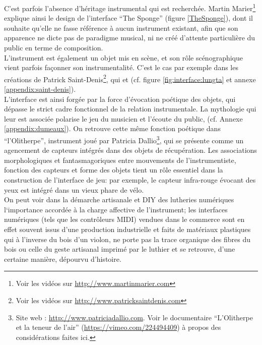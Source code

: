 \noindent C'est parfois l'absence d'héritage instrumental qui est recherchée. Martin Marier\footnote{Voir les vidéos sur \url{http://www.martinmarier.com}} explique ainsi le design de l'interface ``The Sponge'' \cite{marier_sponge_2010} (figure \ref{TheSponge}), dont il souhaite qu'elle ne fasse référence à aucun instrument existant, afin que son apparence ne dicte pas de paradigme musical, ni ne créé d'attente particulière du public en terme de composition.\\
\indent L'instrument est également un objet mis en scène, et son rôle scénographique vient parfois façonner son instrumentalité. C'est le cas par exemple dans les créations de Patrick Saint-Denis\footnote{Voir les vidéos sur \url{http://www.patricksaintdenis.com}}, qui  et  (cf. figure \ref{fig:interface:lungta} et annexe \ref{appendix:saint-denis}).\\
\indent L'interface est ainsi forgée par la force d'évocation poétique des objets, qui dépasse le strict cadre fonctionnel de la relation instrumentale. La mythologie qui leur est associée polarise le jeu du musicien et l'écoute du public,  (cf. Annexe \ref{appendix:dumeaux}). On retrouve cette même fonction poétique dans ``l'Olitherpe'', instrument joué par Patricia Dallio\footnote{Site web : \url{http://www.patriciadallio.com}. Voir le documentaire ``L'Olitherpe et la teneur de l'air'' (\url{https://vimeo.com/224494409}) à propos des considérations faites ici.}, qui se présente comme un agencement de capteurs intégrés dans des objets de récupération. Les associations morphologiques et fantasmagoriques entre mouvements de l'instrumentiste, fonction des capteurs et forme des objets tient un rôle essentiel dans la construction de l'interface de jeu: par exemple, le capteur infra-rouge évocant des yeux est intégré dans un vieux phare de vélo.\\
\indent On peut voir dans la démarche artisanale et \gls{DIY} des lutheries numériques l`importance accordée à la charge affective de l'instrument; les interfaces numériques (tels que les contrôleurs \gls{MIDI}) vendues dans le commerce sont en effet souvent issus d'une production industrielle et faits de matériaux plastiques qui à l'inverse du bois d'un violon, ne porte pas la trace organique des fibres du bois ou celle du geste artisanal imprimé par le luthier et se retrouve, d'une certaine manière, dépourvu d'histoire.

